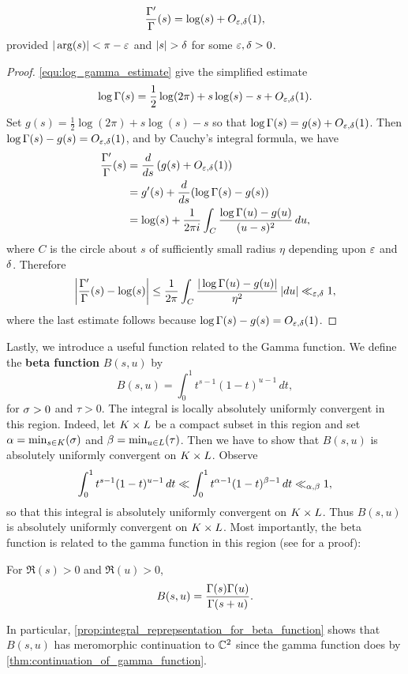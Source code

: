    \begin{proposition}\label{equ:approximtion_for_digamma}
    \[
      \frac{\Gamma'}{\Gamma}(s) = \log(s)+O_{\varepsilon,\delta}(1),
    \]
    provided $|\arg(s)| < \pi-\varepsilon$ and $|s| > \delta$ for some $\varepsilon,\delta > 0$.
    \end{proposition}
    \begin{proof}
      \cref{equ:log_gamma_estimate} give the simplified estimate
      \[
        \log\Gamma(s) = \frac{1}{2}\log(2\pi)+s\log(s)-s+O_{\varepsilon,\delta}(1).
      \]
      Set $g(s) = \frac{1}{2}\log(2\pi)+s\log(s)-s$ so that $\log\Gamma(s) = g(s)+O_{\varepsilon,\delta}(1)$. Then $\log\Gamma(s)-g(s) = O_{\varepsilon,\delta}(1)$, and by Cauchy's integral formula, we have
      \begin{align*}
        \frac{\Gamma'}{\Gamma}(s) &= \frac{d}{ds}\left(g(s)+O_{\varepsilon,\delta}(1)\right) \\
        &= g'(s)+\frac{d}{ds}(\log\Gamma(s)-g(s)) \\
        &= \log(s)+\frac{1}{2\pi i}\int_{C}\frac{\log\Gamma(u)-g(u)}{(u-s)^{2}}\,du,
      \end{align*}
      where $C$ is the circle about $s$ of sufficiently small radius $\eta$ depending upon $\varepsilon$ and $\delta$. Therefore
      \[
        \left|\frac{\Gamma'}{\Gamma}(s)-\log(s)\right| \le \frac{1}{2\pi}\int_{C}\frac{|\log\Gamma(u)-g(u)|}{\eta^{2}}\,|du| \ll_{\varepsilon,\delta} 1,
      \]
      where the last estimate follows because $\log\Gamma(s)-g(s) = O_{\varepsilon,\delta}(1)$.
    \end{proof}

    Lastly, we introduce a useful function related to the Gamma function. We define the \textbf{beta function} $B(s,u)$ by
    \[
        B(s,u) = \int_{0}^{1}t^{s-1}(1-t)^{u-1}\,dt,
    \]
    for $\sigma > 0$ and $\tau > 0$. The integral is locally absolutely uniformly convergent in this region. Indeed, let $K \times L$ be a compact subset in this region and set $\alpha = \min_{s \in K}(\sigma)$ and $\beta = \min_{u \in L}(\tau)$. Then we have to show that $B(s,u)$ is absolutely uniformly convergent on $K \times L$. Observe
    \[
      \int_{0}^{1}t^{s-1}(1-t)^{u-1}\,dt \ll \int_{0}^{1}t^{\alpha-1}(1-t)^{\beta-1}\,dt \ll_{\alpha,\beta} 1,
    \]
    so that this integral is absolutely uniformly convergent on $K \times L$. Thus $B(s,u)$ is absolutely uniformly convergent on $K \times L$. Most importantly, the beta function is related to the gamma function in this region (see \cite{remmert1998classical} for a proof):
    
    \begin{proposition}\label{prop:integral_reprepsentation_for_beta_function}
      For $\Re(s) > 0$ and $\Re(u) > 0$,
      \[
        B(s,u) = \frac{\Gamma(s)\Gamma(u)}{\Gamma(s+u)}.
      \]
    \end{proposition}

    In particular, \cref{prop:integral_reprepsentation_for_beta_function} shows that $B(s,u)$ has meromorphic continuation to $\mathbb{C}^{2}$ since the gamma function does by \cref{thm:continuation_of_gamma_function}.